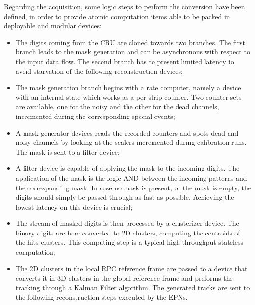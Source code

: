 Regarding the acquisition, some logic steps to perform the conversion have been defined, in order to provide atomic computation items able to be packed in deployable and modular devices:
\begin{itemize}
    \item The digits coming from the CRU are cloned towards two branches.
    The first branch leads to the mask generation and can be asynchronous with respect to the input data flow.
    The second branch has to present limited latency to avoid starvation of the following reconstruction devices;
    \item The mask generation branch begins with a rate computer, namely a device with an internal state which works as a per-strip counter.
	Two counter sets are available, one for the noisy and the other for the dead channels, incremented during the corresponding special events;
    \item  A mask generator devices reads the recorded counters and spots dead and noisy channels by looking at the scalers incremented during calibration runs.
    The mask is sent to a filter device;
    \item A filter device is capable of applying the mask to the incoming digits.
    The application of the mask is the logic AND between the incoming patterns and the corresponding mask.
    In case no mask is present, or the mask is empty, the digits should simply be passed through as fast as possible.
    Achieving the lowest latency on this device is crucial;
    \item The stream of masked digits is then processed by a clusterizer device. The binary digits are here converted to 2D clusters, computing the centroids of the hits clusters. 
    This computing step is a typical high throughput stateless computation;
    \item The 2D clusters in the local RPC reference frame are passed to a device that converts it in 3D clusters in the global reference frame and preforms the tracking through a Kalman Filter algorithm.
    The generated tracks are sent to the following reconstruction steps executed by the EPNs.
\end{itemize}

